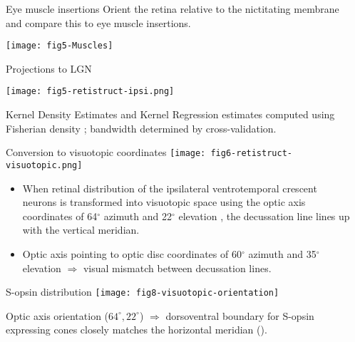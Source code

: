 \documentclass[final]{beamer}
\begin{document}
\begin{frame}{}
\begin{columns}[T]
\begin{column}{.37\linewidth}
    \end{column}

    \begin{column}{.37\linewidth}

      \begin{block}{Eye muscle insertions}
        Orient the retina relative to the nictitating membrane and
        compare this to eye muscle insertions.

        \texttt{[image: fig5-Muscles]}     
      \end{block}

      \begin{block}{Projections to LGN}

        \texttt{[image: fig5-retistruct-ipsi.png]}     

        Kernel Density Estimates and Kernel Regression estimates
        computed using Fisherian density \citep{Fisher1953}; bandwidth
        determined by cross-validation.
      \end{block}

      \begin{block}{Conversion to visuotopic coordinates}
        \texttt{[image: fig6-retistruct-visuotopic.png]}     
        
        \begin{itemize}
      \item When retinal distribution of the ipsilateral ventrotemporal
        crescent neurons is transformed into visuotopic space using
        the optic axis coordinates of 64$^{\circ}$ azimuth and
        22$^{\circ}$ elevation \citep{OommenStahl2008}, the
        decussation line lines up with the vertical meridian.

      \item Optic axis pointing to optic disc coordinates of
        60$^{\circ}$ azimuth and 35$^{\circ}$ elevation
        \citep{Drager1978} $\Rightarrow$ visual mismatch between
        decussation lines.
        \end{itemize}

      \end{block}


      \begin{block}{S-opsin distribution}
        \texttt{[image: fig8-visuotopic-orientation]}     

        Optic axis orientation ($64^{\circ},22^{\circ}$)
        $\Rightarrow$ dorsoventral boundary for S-opsin expressing
        cones closely matches the horizontal meridian
        (\citealp{HaverkampEtal2005}).


\end{block}
\end{column}
\end{columns}
\end{frame}
\end{document}
